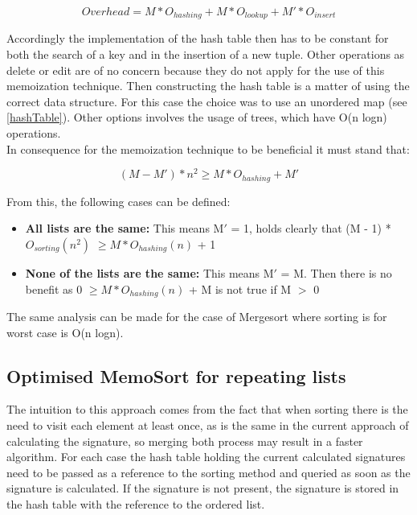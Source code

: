 \documentclass[a4paper,12pt]{article}
\begin{document}
\begin{equation}
Overhead =  M * O_{hashing} + M * O_{lookup} + M' * O_{insert}
\end{equation}

Accordingly the implementation of the hash table then has to be constant for both the search of a key and in the insertion of a new tuple. Other operations as delete or edit are of no concern because they do not apply for the use of this memoization technique. Then constructing the hash table is a matter of using the correct data structure. For this case the choice was to use an unordered map (see \ref{hashTable}). Other options involves the usage of trees, which have O(n logn) operations.
\\
In consequence for the memoization technique to be beneficial it must stand that:

\begin{equation}
(M - M') *  n^2  \geq M * O_{hashing} + M'
\end{equation}

From this, the following cases can be defined:
\begin{itemize}
\item {\bf All lists are the same:}  This means M$'$ = 1, holds clearly that (M - 1) *   $O_{sorting}(n^2)$   $\geq M *O_{hashing}(n)$ + 1
\item {\bf None of the lists are the same:} This means M$'$ = M. Then there is no benefit as 0 $ \geq M * O_{hashing}(n)$ + M is not true if M $>$ 0
\end{itemize}

The same analysis can be made for the case of Mergesort where sorting is for worst case is O(n logn). \\

\subsection{Optimised MemoSort for repeating lists} \label{OptMemoSort}
The intuition to this approach comes from the fact that when sorting there is the need to visit each element at least once, as is the same in the current approach of calculating the signature, so merging both process may result in a faster algorithm.
For each case the hash table holding the current calculated signatures need to be passed as a reference to the sorting method and queried as soon as the signature is calculated. If the signature is not present, the signature is stored in the hash table with the reference to the ordered list. \\
\end{document}
